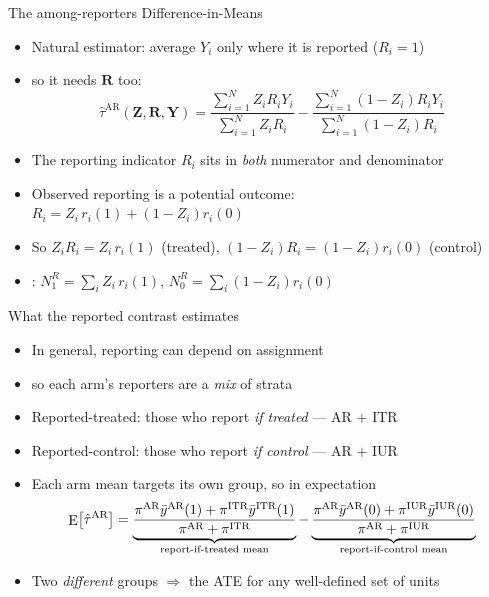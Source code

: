 \documentclass[table, xcolor = {dvipsnames}, 9pt]{beamer}
\theoremstyle{plain}
\newcommand{\mh}[1]{{\color{magenta}{#1}}}
\DeclareMathOperator{\E}{\rm{E}}
\begin{document}
\begin{frame}[t]{The among-reporters Difference-in-Means}
\vfill
\begin{itemize} \vfill
\item Natural estimator: average $Y_i$ only where it is reported ($R_i = 1$) \vfill
\item[] so it needs $\bm{R}$ too: \vfill
\begin{equation*}
\hat{\tau}^{\textrm{AR}}\left(\bm{Z}, \bm{R}, \bm{Y}\right) = \frac{\sum_{i=1}^N Z_i R_i Y_i}{\sum_{i=1}^N Z_i R_i} - \frac{\sum_{i=1}^N \left(1 - Z_i\right) R_i Y_i}{\sum_{i=1}^N \left(1 - Z_i\right) R_i}
\end{equation*} \vfill
\item The reporting indicator $R_i$ sits in \emph{both} numerator and denominator \vfill
\item Observed reporting is a potential outcome: $R_i = Z_i\, r_i(1) + \left(1 - Z_i\right) r_i(0)$ \vfill
\item[] So $Z_i R_i = Z_i\, r_i(1)$ (treated), $\left(1 - Z_i\right) R_i = \left(1 - Z_i\right) r_i(0)$ (control) \vfill
\item \mh{Random denominators}: $N_1^R = \sum_i Z_i\, r_i(1)$, $N_0^R = \sum_i \left(1 - Z_i\right) r_i(0)$ \vfill
\end{itemize} \vfill
\end{frame}
\begin{frame}[t]{What the reported contrast estimates}
\vfill
\begin{itemize} \vfill
\item In general, reporting can depend on assignment \vfill
\item[] so each arm's reporters are a \emph{mix} of strata \vfill
\item Reported-treated: those who report \emph{if treated} --- AR $+$ ITR \vfill
\item Reported-control: those who report \emph{if control} --- AR $+$ IUR \vfill
\item Each arm mean targets its own group, so in expectation \vfill
{\footnotesize
\begin{equation*}
\E\!\left[\hat{\tau}^{\textrm{AR}}\right] = \underbrace{\frac{\pi^{\textrm{AR}} \bar{y}^{\textrm{AR}}(1) + \pi^{\textrm{ITR}} \bar{y}^{\textrm{ITR}}(1)}{\pi^{\textrm{AR}} + \pi^{\textrm{ITR}}}}_{\text{report-if-treated mean}} - \underbrace{\frac{\pi^{\textrm{AR}} \bar{y}^{\textrm{AR}}(0) + \pi^{\textrm{IUR}} \bar{y}^{\textrm{IUR}}(0)}{\pi^{\textrm{AR}} + \pi^{\textrm{IUR}}}}_{\text{report-if-control mean}}
\end{equation*}
}
\vfill
\item Two \emph{different} groups $\Rightarrow$ \mh{not} the ATE for any well-defined set of units \vfill
\end{itemize} \vfill
\end{frame}
\end{document}
